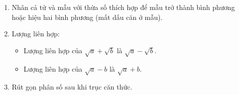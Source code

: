 \begin{enumerate}
\item Nhân cả tử và mẫu với thừa số thích hợp để mẫu trở thành bình phương hoặc hiệu hai bình phương (mất dấu căn ở mẫu).
\item Lượng liên hợp:
\begin{itemize}
\item Lượng liên hợp của $\sqrt{a} + \sqrt{b}$ là $\sqrt{a} - \sqrt{b}$.
\item Lượng liên hợp của $\sqrt{a} - b$ là $\sqrt{a} + b$.
\end{itemize}
\item Rút gọn phân số sau khi trục căn thức.
\end{enumerate}
